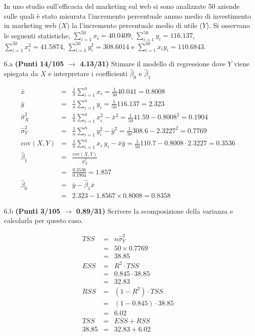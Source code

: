 \documentclass[
  11pt,
]{book}
\theoremstyle{mytheoremstyle}
\theoremstyle{mydefstyle}
\newenvironment{sol}
  {
  \begin{tcolorbox}[enhanced,breakable,arc=0.1mm,boxrule=1pt,colback=white,colframe=iblue,
  title=\bf \fontfamily{lmss}\selectfont \hspace{.5 cm} Soluzione,drop fuzzy shadow]

}{
\end{tcolorbox}
  }
\begin{document}
In uno studio sull'efficacia del marketing sul web si sono analizzate 50 aziende
sulle quali è stato misurata l'incremento percentuale annuo medio di investimento in marketing
web (\(X\)) la l'incremento percentuale medio di utile (\(Y\)). Si osservano le seguenti statistiche, \(\sum_{i=1}^{50}x_i=40.0409\), \(\sum_{i=1}^{50}y_i=116.137\),
\(\sum_{i=1}^{50}x_i^2=41.5874\), \(\sum_{i=1}^{50}y_i^2=308.6014\) e \(\sum_{i=1}^{50}x_iy_i=110.6843\).

6.a \textbf{(Punti 14/105 \(\rightarrow\) 4.13/31)} Stimare il modello di regressione dove \(Y\) viene spiegata da \(X\) e interpretare
i coefficienti \(\hat\beta_0\) e \(\hat\beta_1\)

\begin{sol}
\begin{eqnarray*}
           \bar x &=&\frac 1 n\sum_{i=1}^n x_i = \frac {1}{ 50 }  40.041 =  0.8008 \\
           \bar y &=&\frac 1 n\sum_{i=1}^n y_i = \frac {1}{ 50 }  116.137 =  2.323 \\
           \hat\sigma_X^2&=&\frac 1 n\sum_{i=1}^n x_i^2-\bar x^2=\frac {1}{ 50 }  41.59  - 0.8008 ^2= 0.1904 \\
           \hat\sigma_Y^2&=&\frac 1 n\sum_{i=1}^n y_i^2-\bar y^2=\frac {1}{ 50 }  308.6  - 2.3227 ^2= 0.7769 \\
           \text{cov}(X,Y)&=&\frac 1 n\sum_{i=1}^n x_i~y_i-\bar x\bar y=\frac {1}{ 50 }  110.7 - 0.8008 \cdot 2.3227 = 0.3536 \\
           \hat\beta_1 &=& \frac{\text{cov}(X,Y)}{\hat\sigma_X^2} \\
                    &=& \frac{ 0.3536 }{ 0.1904 }  =  1.857 \\
           \hat\beta_0 &=& \bar y - \hat\beta_1 \bar x\\
                    &=&  2.323 - 1.8567 \times  0.8008 = 0.8358 
         \end{eqnarray*}

\end{sol}

6.b \textbf{(Punti 3/105 \(\rightarrow\) 0.89/31)} Scrivere la scomposizione della varianza e
calcolarla per questo caso.

\begin{sol}
\begin{eqnarray*}
   TSS &=& n\hat\sigma^2_Y\\
      &=& 50 \times 0.7769 \\
      &=&  38.85 \\
   ESS &=& R^2\cdot TSS\\
      &=&  0.845 \cdot 38.85 \\
      &=& 32.83 \\
   RSS &=& (1-R^2)\cdot TSS\\
      &=& (1- 0.845 )\cdot 38.85 \\
      &=&  6.02 \\
   TSS &=& ESS+RSS \\ 38.85  &=&  32.83 + 6.02 
  \end{eqnarray*}

\end{sol}
\end{document}
